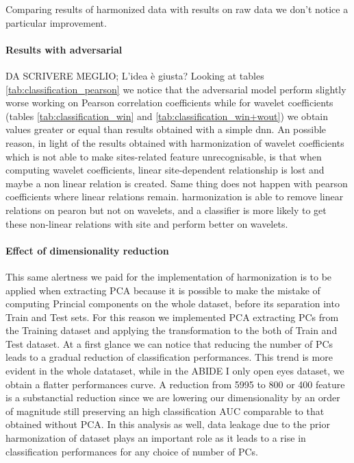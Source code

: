 \documentclass[11pt]{report}
\begin{document}
Comparing results of harmonized data with results on raw data we don't notice a particular improvement.


\paragraph{Results with adversarial}
DA SCRIVERE MEGLIO; L'idea è giusta?
Looking at tables \ref{tab:classification_pearson} we notice that the adversarial model perform slightly worse working on Pearson correlation coefficients while for wavelet coefficients (tables \ref{tab:classification_win} and \ref{tab:classification_win+wout}) we obtain values greater or equal than results obtained with a simple dnn.
An possible reason, in light of the results obtained with harmonization of wavelet coefficients which is not able to make sites-related feature unrecognisable, is that when computing wavelet coefficients, linear site-dependent relationship is lost and maybe a non linear relation is created.
Same thing does not happen with pearson coefficients where linear relations remain. harmonization is able to remove linear relations on pearon but not on wavelets, and a classifier is more likely to get these non-linear relations with site and perform better on wavelets.





\paragraph{Effect of dimensionality reduction}
This same alertness we paid for the implementation of harmonization is to be applied when extracting PCA because it is possible to make the mistake of computing Princial components on the whole dataset, before its separation into Train and Test sets.
For this reason we implemented PCA extracting PCs from the Training dataset and applying the transformation to the both of Train and Test dataset.
At a first glance we can notice that reducing the number of PCs leads to a gradual reduction of classification performances.
This trend is more evident in the whole datataset, while in the ABIDE I only open eyes dataset, we obtain a flatter performances curve.
A reduction from 5995 to 800 or 400 feature is a substanctial reduction since we are lowering our dimensionality by an order of magnitude still preserving an high classification AUC comparable to that obtained without PCA. In this analysis as well, data leakage due to the prior harmonization of dataset plays an important role as it leads to a rise in classification performances for any choice of number of PCs.
\end{document}
